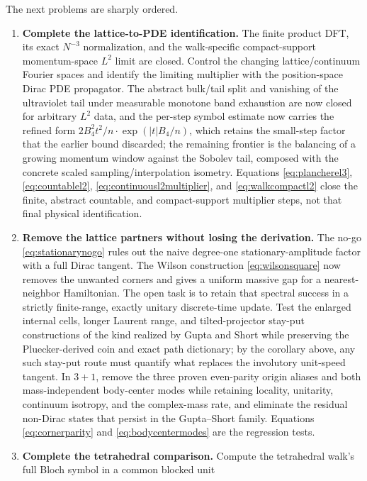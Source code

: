 \documentclass[11pt]{article}
\begin{document}
The next problems are sharply ordered.
\begin{enumerate}[leftmargin=2em]
  \item \textbf{Complete the lattice-to-PDE identification.}
  The finite product DFT, its exact $N^{-3}$ normalization, and the
  walk-specific compact-support momentum-space $L^2$ limit are closed.  Control
  the changing lattice/continuum Fourier spaces and identify the limiting
  multiplier with the position-space Dirac PDE propagator.  The abstract
  bulk/tail split and vanishing of the ultraviolet tail under measurable
  monotone band exhaustion are now closed for arbitrary $L^2$ data, and the
  per-step symbol estimate now carries the refined form
  $2B_4^2t^2/n\cdot\exp(|t|B_4/n)$, which retains the small-step factor
  that the earlier bound discarded; the remaining frontier is the
  balancing of a growing momentum window against the Sobolev tail,
  composed with the concrete scaled sampling/interpolation isometry.
  Equations \eqref{eq:plancherel3}, \eqref{eq:countablel2},
  \eqref{eq:continuousl2multiplier}, and \eqref{eq:walkcompactl2} close the
  finite, abstract countable, and compact-support multiplier steps, not that
  final physical identification.
  \item \textbf{Remove the lattice partners without losing the derivation.}
  The no-go \eqref{eq:stationarynogo} rules out the naive degree-one
  stationary-amplitude factor with a full Dirac tangent.  The Wilson
  construction \eqref{eq:wilsonsquare} now removes the unwanted corners and
  gives a uniform massive gap for a nearest-neighbor Hamiltonian.  The open
  task is to retain that spectral success in a strictly finite-range,
  exactly unitary discrete-time update.  Test the enlarged
  internal cells, longer Laurent range, and tilted-projector stay-put
  constructions of the kind realized by Gupta and Short
  \cite{GuptaShortDoubling} while preserving the
  Pluecker-derived coin and exact path dictionary; by the corollary above,
  any such stay-put route must quantify what replaces the involutory
  unit-speed tangent.  In $3+1$, remove the three
  proven even-parity origin
   aliases and both mass-independent body-center modes while retaining locality,
   unitarity, continuum isotropy, and the complex-mass rate, and eliminate
   the residual non-Dirac states that persist in the Gupta--Short family.
   Equations
   \eqref{eq:cornerparity} and \eqref{eq:bodycentermodes} are the regression
   tests.
  \item \textbf{Complete the tetrahedral comparison.}
  Compute the tetrahedral walk's full Bloch symbol in a common blocked unit

\end{enumerate}
\end{document}
